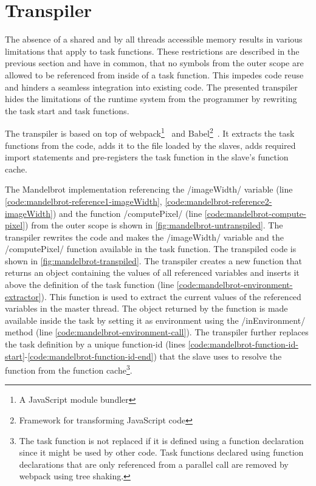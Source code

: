 \section{Transpiler}\label{sec:transpiler}
The absence of a shared and by all threads accessible memory results in various limitations that apply to task functions. These restrictions are described in the previous section and have in common, that no symbols from the outer scope are allowed to be referenced from inside of a task function. This impedes code reuse and hinders a seamless integration into existing code. The presented transpiler hides the limitations of the runtime system from the programmer by rewriting the task start and task functions.

The transpiler is based on top of webpack\footnote{A JavaScript module bundler}~\cite{webpack} and Babel\footnote{Framework for transforming JavaScript code}~\cite{babel}. It extracts the task functions from the code, adds it to the file loaded by the slaves, adds required import statements and pre-registers the task function in the slave's function cache. 

The Mandelbrot implementation referencing the \javascriptinline/imageWidth/ variable (line \ref{code:mandelbrot-reference1-imageWidth}, \ref{code:mandelbrot-reference2-imageWidth}) and the function \javascriptinline/computePixel/ (line \ref{code:mandelbrot-compute-pixel}) from the outer scope is shown in \cref{fig:mandelbrot-untranspiled}. The transpiler rewrites the code and makes the \javascriptinline/imageWidth/ variable and the \javascriptinline/computePixel/ function available in the task function. The transpiled code is shown in \cref{fig:mandelbrot-transpiled}. The transpiler creates a new function that returns an object containing the values of all referenced variables and inserts it above the definition of the task function (line \ref{code:mandelbrot-environment-extractor}). This function is used to extract the current values of the referenced variables in the master thread. The object returned by the function is made available inside the task by setting it as environment using the \javascriptinline/inEnvironment/ method (line \ref{code:mandelbrot-environment-call}). The transpiler further replaces the task definition by a unique function-id (lines \ref{code:mandelbrot-function-id-start}-\ref{code:mandelbrot-function-id-end}) that the slave uses to resolve the function from the function cache\footnote{The task function is not replaced if it is defined using a function declaration since it might be used by other code. Task functions declared using function declarations that are only referenced from a parallel call are removed by webpack using tree shaking.}. 


